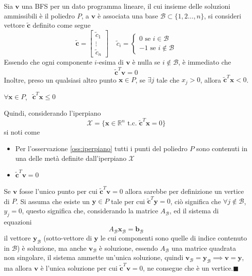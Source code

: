 \documentclass[10pt, letterpaper]{report}
\begin{document}
\boxedMath{$\impliedby$} Sia $\mathbf v$ una BFS per un dato programma lineare, il cui insieme delle soluzioni ammissibili è il poliedro $P$, a $\mathbf v$ è associata una base $\mathcal B \subset \{1,2\dots, n\}$, si consideri vettore $\tilde{\mathbf c}$ definito come segue\begin{equation}
    \tilde{\mathbf c}=\begin{bmatrix}
        \tilde c_1\\ \vdots \\ \tilde c_n
    \end{bmatrix} \ \ \ \ \ \tilde c_i=\begin{cases}
        0\text{ se }i\in \mathcal B\\ 
        -1\text{ se }i \notin \mathcal B
    \end{cases}
\end{equation}  
Essendo che ogni componente $i$-esima di $\mathbf v$ è nulla se $i\notin \mathcal B$, è immediato che $$ \tilde{\mathbf c}^T\mathbf v = 0$$
Inoltre, preso un qualsiasi altro punto $\mathbf x \in P$, se $\exists j$ tale che $x_j>0$, allora $\tilde{\mathbf c}^T\mathbf x < 0$. \begin{osservazione}\label{oss:iperpiano}
    $\forall \mathbf x \in P$, $\ \ \tilde{\mathbf c}^T\mathbf x \le 0$
\end{osservazione}
Quindi, considerando l'iperpiano 
$$\mathcal X = \{\mathbf x \in \mathbb R^n \text{ t.c. } \tilde{\mathbf c}^T\mathbf x =0\} $$
si noti come\begin{itemize}
    \item Per l'osservazione \ref{oss:iperpiano} tutti i punti del poliedro $P$ sono contenuti in una delle metà definite dall'iperpiano $\mathcal X $
    \item $\tilde{\mathbf c}^T\mathbf v = 0$
\end{itemize}
Se $\mathbf v$ fosse l'unico punto per cui $\tilde{\mathbf c}^T\mathbf v = 0$ allora sarebbe per definizione un vertice di $P$. Si assuma che esiste un $\mathbf y \in P$ tale per cui $\tilde{\mathbf c}^T\mathbf y = 0$, ciò significa che $\forall j\notin \mathcal B$, $y_j=0$, questo significa che, considerando la matrice $A_{\mathcal B}$, ed il sistema di equazioni 
$$A_{\mathcal B}\mathbf x_{\mathcal B}=\mathbf b_{\mathcal B} $$
il vettore $\mathbf y_{\mathcal B}$ (sotto-vettore di $\mathbf y$ le cui componenti sono quelle di indice contenuto in $\mathcal B$) è soluzione, ma anche $\mathbf v_{\mathcal B}$ è soluzione, essendo $A_{\mathcal B}$ una matrice quadrata non singolare, il sistema ammette un'unica soluzione, quindi $\mathbf v_{\mathcal B}=\mathbf y_{\mathcal B}\implies \mathbf v =\mathbf y$, ma allora $\mathbf v$ è l'unica soluzione per cui $\tilde{\mathbf c}^T\mathbf v = 0$, ne consegue che è un vertice.\hfill$\blacksquare$
\end{document}
